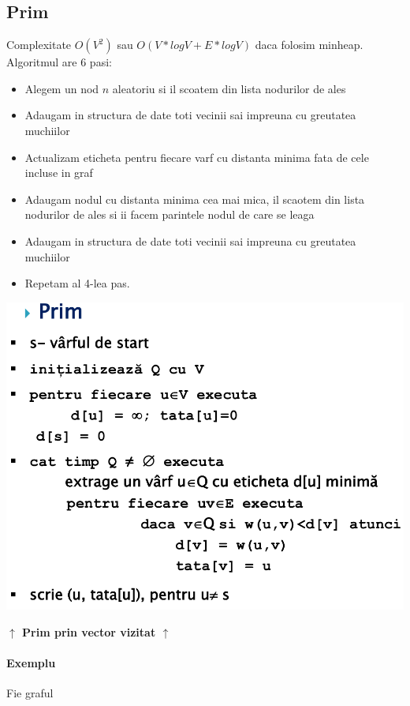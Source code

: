 \documentclass{article}
\begin{document}
\subsection*{Prim} Complexitate $O(V^2)$ sau $O(V*logV + E*logV)$ daca folosim minheap. Algoritmul are 6 pasi:
\begin{itemize}
    \item Alegem un nod $n$ aleatoriu si il scoatem din lista nodurilor de ales
    \item Adaugam in structura de date toti vecinii sai impreuna cu greutatea muchiilor
    \item Actualizam eticheta pentru fiecare varf cu distanta minima fata de cele incluse in graf
    \item Adaugam nodul cu distanta minima cea mai mica, il scaotem din lista nodurilor de ales si ii facem parintele nodul de care se leaga
    \item Adaugam in structura de date toti vecinii sai impreuna cu greutatea muchiilor
    \item Repetam al 4-lea pas.
\end{itemize}

\begin{center}
    \includegraphics*[scale=0.3]{2_prim.png}
\end{center}
\begin{center}
    \textbf{$\uparrow$ Prim prin vector vizitat $\uparrow$}
\end{center}


\paragraph*{Exemplu} Fie graful
\end{document}
